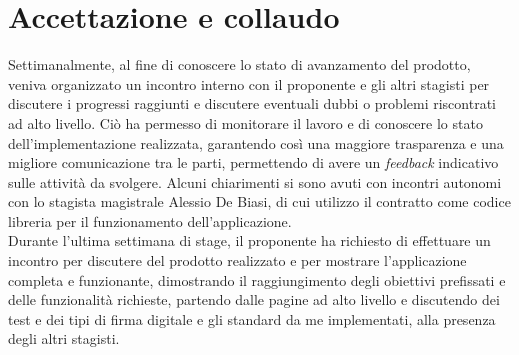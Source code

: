 \clearpage

\section{Accettazione e collaudo}\label{sec:verifica-validazione-accettazione}

Settimanalmente, al fine di conoscere lo stato di avanzamento del prodotto, veniva organizzato un incontro interno con
il proponente e gli altri stagisti per discutere i progressi raggiunti e discutere eventuali dubbi o problemi riscontrati ad alto livello.
Ciò ha permesso di monitorare il lavoro e di conoscere lo stato dell'implementazione realizzata, garantendo così una maggiore
trasparenza e una migliore comunicazione tra le parti, permettendo di avere un \textit{feedback} indicativo sulle attività da svolgere.
Alcuni chiarimenti si sono avuti con incontri autonomi con lo stagista magistrale Alessio De Biasi, di cui utilizzo il contratto come codice libreria 
per il funzionamento dell'applicazione. \\

Durante l'ultima settimana di stage, il proponente ha richiesto di effettuare un incontro per discutere del prodotto realizzato e per
mostrare l'applicazione completa e funzionante, dimostrando il raggiungimento degli obiettivi prefissati e delle funzionalità richieste, 
partendo dalle pagine ad alto livello e discutendo dei test e dei tipi di firma digitale e gli standard da me implementati, alla presenza degli altri stagisti. 